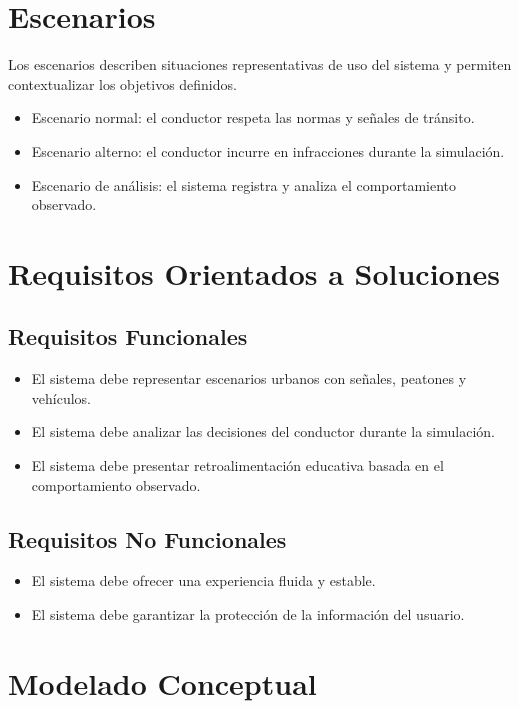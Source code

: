 \documentclass[12pt]{article}
\begin{document}
\section{Escenarios}
Los escenarios describen situaciones representativas de uso del sistema y permiten contextualizar los objetivos definidos.

\begin{itemize}
    \item Escenario normal: el conductor respeta las normas y señales de tránsito.
    \item Escenario alterno: el conductor incurre en infracciones durante la simulación.
    \item Escenario de análisis: el sistema registra y analiza el comportamiento observado.
\end{itemize}

\section{Requisitos Orientados a Soluciones}

\subsection{Requisitos Funcionales}
\begin{itemize}
    \item El sistema debe representar escenarios urbanos con señales, peatones y vehículos.
    \item El sistema debe analizar las decisiones del conductor durante la simulación.
    \item El sistema debe presentar retroalimentación educativa basada en el comportamiento observado.
\end{itemize}

\subsection{Requisitos No Funcionales}
\begin{itemize}
    \item El sistema debe ofrecer una experiencia fluida y estable.
    \item El sistema debe garantizar la protección de la información del usuario.
\end{itemize}

\section{Modelado Conceptual}
\end{document}
